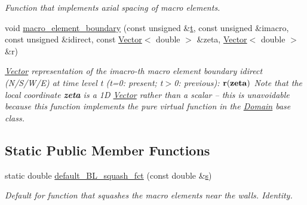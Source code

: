 \begin{DoxyCompactItemize}
\begin{DoxyCompactList}\small\item\em Function that implements axial spacing of macro elements. \end{DoxyCompactList}\item 
void \hyperlink{classoomph_1_1CollapsibleChannelDomain_a2c0a5bd21e12fbcc1cdd753c0f205da2}{macro\+\_\+element\+\_\+boundary} (const unsigned \&\hyperlink{cfortran_8h_af6f0bd3dc13317f895c91323c25c2b8f}{t}, const unsigned \&imacro, const unsigned \&idirect, const \hyperlink{classoomph_1_1Vector}{Vector}$<$ double $>$ \&zeta, \hyperlink{classoomph_1_1Vector}{Vector}$<$ double $>$ \&r)
\begin{DoxyCompactList}\small\item\em \hyperlink{classoomph_1_1Vector}{Vector} representation of the imacro-\/th macro element boundary idirect (N/\+S/\+W/E) at time level t (t=0\+: present; t$>$0\+: previous)\+: $ {\bf r}({\bf zeta}) $ Note that the local coordinate {\bfseries zeta} is a 1D \hyperlink{classoomph_1_1Vector}{Vector} rather than a scalar -- this is unavoidable because this function implements the pure virtual function in the \hyperlink{classoomph_1_1Domain}{Domain} base class. \end{DoxyCompactList}\end{DoxyCompactItemize}
\subsection*{Static Public Member Functions}
\begin{DoxyCompactItemize}
\item 
static double \hyperlink{classoomph_1_1CollapsibleChannelDomain_a4222184a903df3efdd93cc306bac4414}{default\+\_\+\+B\+L\+\_\+squash\+\_\+fct} (const double \&\hyperlink{cfortran_8h_ab7123126e4885ef647dd9c6e3807a21c}{s})
\begin{DoxyCompactList}\small\item\em Default for function that squashes the macro elements near the walls. Identity. \end{DoxyCompactList}\end{DoxyCompactItemize}
